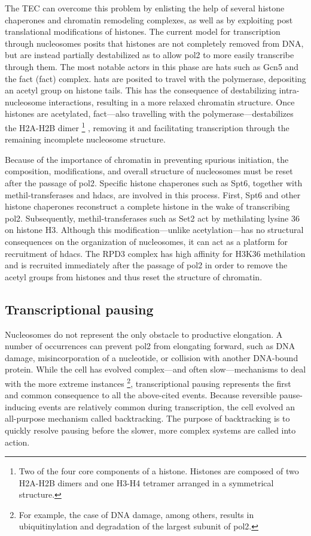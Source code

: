 The TEC can overcome this problem by enlisting the help of several histone chaperones and chromatin remodeling complexes, as well as by exploiting post translational modifications of histones. 
The current model for transcription through nucleosomes posits that histones are not completely removed from DNA, but are instead partially destabilized as to allow \gls{pol2} to more easily transcribe through them.
The most notable actors in this phase are \gls{hats} such as Gcn5 and the \gls{fact} (\glsdesc{fact}) complex. 
\gls{hats} are posited to travel with the polymerase, depositing an acetyl group on histone tails.
This has the consequence of destabilizing intra-nucleosome interactions, resulting in a more relaxed chromatin structure.
Once histones are acetylated, \gls{fact}---also travelling with the polymerase---destabilizes the H2A-H2B dimer \footnote{
Two of the four core components of a histone. Histones are composed of two H2A-H2B dimers and one H3-H4 tetramer arranged in a symmetrical structure. 
} , removing it and facilitating transcription through the remaining incomplete nucleosome structure. 

Because of the importance of chromatin in preventing spurious initiation, the composition, modifications, and overall structure of nucleosomes must be reset after the passage of \gls{pol2}. 
Specific histone chaperones such as Spt6, together with methil-transferases and \gls{hdacs}, are involved in this process.
First, Spt6 and other histone chaperones reconstruct a complete histone in the wake of transcribing \gls{pol2}.
Subsequently, methil-transferases such as Set2 act by methilating lysine 36 on histone H3. 
Although this modification---unlike acetylation---has no structural consequences on the organization of nucleosomes, it can act as a platform for recruitment of \gls{hdacs}.
The RPD3 complex has high affinity for H3K36 methilation and is recruited immediately after the passage of \gls{pol2} in order to remove the acetyl groups from histones and thus reset the structure of chromatin.

\subsection{Transcriptional pausing}
Nucleosomes do not represent the only obstacle to productive elongation.
A number of occurrences can prevent \gls{pol2} from elongating forward, such as DNA damage, misincorporation of a nucleotide, or collision with another DNA-bound protein.
While the cell has evolved complex---and often slow---mechanisms to deal with the more extreme instances \footnote{For example, the case of DNA damage, among others, results in ubiquitinylation and degradation of the largest subunit of \gls{pol2}.}, transcriptional pausing represents the first and common consequence to all the above-cited events. 
Because reversible pause-inducing events are relatively common during transcription, the cell evolved an all-purpose mechanism called backtracking.
The purpose of backtracking is to quickly resolve pausing before the slower, more complex systems are called into action. 

